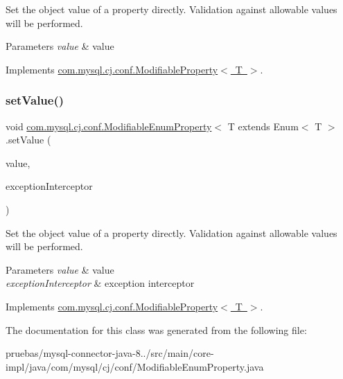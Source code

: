 Set the object value of a property directly. Validation against allowable values will be performed.


\begin{DoxyParams}{Parameters}
{\em value} & value \\
\hline
\end{DoxyParams}


Implements \mbox{\hyperlink{interfacecom_1_1mysql_1_1cj_1_1conf_1_1_modifiable_property_a22d1b9332f523a15f3edf432b36e4e07}{com.\+mysql.\+cj.\+conf.\+Modifiable\+Property$<$ T $>$}}.

\mbox{\label{classcom_1_1mysql_1_1cj_1_1conf_1_1_modifiable_enum_property_aeb04443d10144806024e2a28bf4942de}} 
\subsubsection{\texorpdfstring{set\+Value()}{setValue()}\hspace{0.1cm}{\footnotesize\ttfamily [2/2]}}
{\footnotesize\ttfamily void \mbox{\hyperlink{classcom_1_1mysql_1_1cj_1_1conf_1_1_modifiable_enum_property}{com.\+mysql.\+cj.\+conf.\+Modifiable\+Enum\+Property}}$<$ T extends Enum$<$ T $>$.set\+Value (\begin{DoxyParamCaption}\item[{T}]{value,  }\item[{\mbox{\hyperlink{interfacecom_1_1mysql_1_1cj_1_1exceptions_1_1_exception_interceptor}{Exception\+Interceptor}}}]{exception\+Interceptor }\end{DoxyParamCaption})}

Set the object value of a property directly. Validation against allowable values will be performed.


\begin{DoxyParams}{Parameters}
{\em value} & value \\
\hline
{\em exception\+Interceptor} & exception interceptor \\
\hline
\end{DoxyParams}


Implements \mbox{\hyperlink{interfacecom_1_1mysql_1_1cj_1_1conf_1_1_modifiable_property_a26fe9373efcddc22eb1fc1234eae81ed}{com.\+mysql.\+cj.\+conf.\+Modifiable\+Property$<$ T $>$}}.



The documentation for this class was generated from the following file\+:\begin{DoxyCompactItemize}
\item 
pruebas/mysql-\/connector-\/java-\/8../src/main/core-\/impl/java/com/mysql/cj/conf/Modifiable\+Enum\+Property.\+java\end{DoxyCompactItemize}

